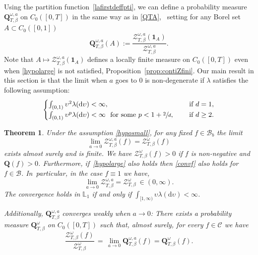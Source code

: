 \documentclass[10pt]{amsart}
\let\mathcal\mathscr
\newtheorem{theorem}{Theorem}[section]
\theoremstyle{definition}
\newcommand{\dd}{\mathrm{d}}
\newcommand{\ind}{\mathbf{1}}
\newcommand{\cB}{{\ensuremath{\mathcal B}} }
\newcommand{\cC}{{\ensuremath{\mathcal C}} }
\newcommand{\cZ}{{\ensuremath{\mathcal Z}} }
\newcommand{\bQ}{{\ensuremath{\mathbf Q}} }
\newcommand{\bbL}{{\ensuremath{\mathbb L}} }
\let\gl\lambda
\let\ups\upsilon
\let\go\omega
\begin{document}
 Using the partition function~\eqref{lafirstdeffpti}, we can define a probability measure $\bQ^{\go,a}_{T,\beta}$ on $C_0([0,T])$ in the same way as in \eqref{QTA}, \ie \ setting for any Borel set $A\subset C_0([0,1])$ \,
\[
\bQ^{\go,a}_{T,\beta}(A):= \frac{\cZ^{\go,a}_{T,\beta}(\ind_{A})}{ \cZ^{\go,a}_{T,\beta} }.
\]
Note that $A\mapsto \cZ^{\go,a}_{T,\beta}(\ind_{A})$ defines a locally finite measure on $C_0([0,T])$ even when \eqref{hypolarge} is not satisfied, \cf Proposition~\ref{prop:contiZfini}.
Our main result in this section is that the limit when $a$ goes to $0$ is non-degenerate if $\gl$ satisfies the following assumption:
\begin{equation}\label{hyposmall}
\begin{cases}
\int_{(0,1)} \ups^{2} \gl(\dd \ups)<\infty, \quad &\text{ if } d=1,\\
\int_{(0,1)} \ups^{p} \gl(\dd \ups)<\infty \ \text{ for some } p<1+\sfrac{2}{d}, \quad &\text{ if } d\ge 2.
\end{cases}
\end{equation}


\begin{theorem}\label{thm:zalpha}
Under the assumption \eqref{hyposmall}, for any fixed $f\in \cB_b$ the limit
\begin{equation}\label{convf}
\lim_{a\to 0}\cZ^{\go,a}_{T,\beta}(f)= \cZ^{\go}_{T,\beta}(f)
\end{equation}
exists almost surely and is finite. We have $\cZ^{\go}_{T,\beta}(f)>0$ if $f$ is non-negative and $\bQ(f)>0$.
Furthermore, if~\eqref{hypolarge} also holds then \eqref{convf} also holds for $f\in \mathcal B$. In~particular, in the case $f\equiv 1$ we have,
\begin{equation}\label{convparty}
\lim_{a\to 0}\cZ^{\go,a}_{T,\beta}= \cZ^{\go}_{T,\beta} \ \in (0,\infty).
\end{equation}
The convergence holds in $\bbL_1$ if and only if $\int_{[1,\infty)} \ups \gl(\dd \ups)<\infty$.

 Additionally, $\bQ^{\go,a}_{T,\beta}$ converges weakly when $a\to 0$: There exists a probability measure $\bQ^{\go}_{T,\beta}$ on $C_0([0,T])$ such that, almost surely, for every
$f\in \cC$ we have
\begin{equation}\label{lescontis}
\frac{ \cZ^{\go}_{T,\beta}(f)}{ \cZ^{\go}_{T,\beta}}\, =\, \lim_{a\to 0}\bQ^{\go,a}_{T,\beta}(f)= \bQ^{\go}_{T,\beta}(f).
\end{equation}
\end{theorem}
\end{document}
